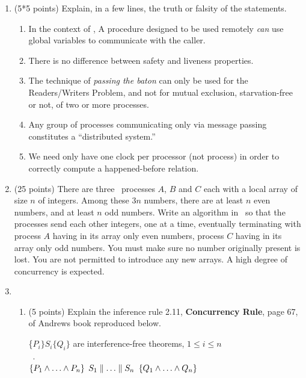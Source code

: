 \begin{enumerate}

\item (5*5 points)
Explain, in a few lines, the truth or falsity of the statements.

\begin{enumerate}

\item
In the context of \RPC, A procedure designed to be used remotely {\em
can} use global variables to communicate with the caller.

\item
There is no difference between safety and liveness properties.

\item
The technique of {\em passing the baton} can only be used for the
Readers/Writers Problem, and not for mutual exclusion, starvation-free
or not, of two or more processes.

\item Any group of processes communicating only via message passing
constitutes a ``distributed system.''


\item We need only have one clock per processor (not process)
in order to correctly compute a happened-before relation.

\end{enumerate}

\item (25 points) There are three \CSP\ processes $A$, $B$ and $C$
each with a local array of size $n$ of integers.  Among these $3n$
numbers, there are at least $n$ even numbers, and at least $n$ odd
numbers.  Write an algorithm in \CSP\ so that the processes send each
other integers, one at a time, eventually terminating with process $A$
having in its array only even numbers, process $C$ having in its array
only odd numbers.  You must make sure no number originally present is
lost.  You are not permitted to introduce any new arrays.  A high
degree of concurrency is expected.

\item 
\begin{enumerate}
\item (5 points)
Explain the inference rule 2.11, {\bf Concurrency Rule}, page 67, of
Andrews book reproduced below.

\begin{centering}
\{$P_i\} S_i \{Q_i\}$ are interference-free theorems, $1 \leq i \leq
n$\\[-8pt]
~.\hrulefill\\[-4pt]
$\{P_1 \wedge \ldots \wedge P_n\}$
\quad\co\quad $S_1 \parallel \ldots \parallel S_n$ \quad\oc\quad
$\{Q_1 \wedge \ldots \wedge Q_n\}$\par
\end{centering}


\end{enumerate}
\end{enumerate}
